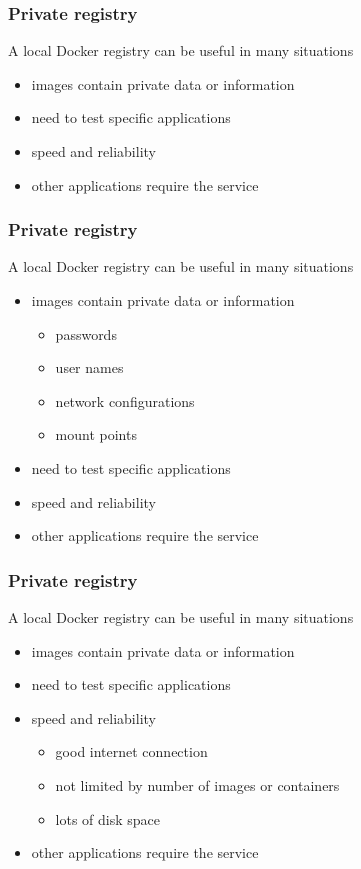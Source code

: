 

\begin{frame}
\frametitle{Private registry}
A local Docker registry can be useful in many situations
\begin{itemize}
\item images contain private data or information
\item need to test specific applications
\item speed and reliability
\item other applications require the service
\end{itemize}
\end{frame}


\begin{frame}
\frametitle{Private registry}
A local Docker registry can be useful in many situations
\begin{itemize}
\item images contain private data or information
  \begin{itemize}
  \item passwords
  \item user names
  \item network configurations
  \item mount points
  \end{itemize}
\item need to test specific applications
\item speed and reliability
\item other applications require the service
\end{itemize}
\end{frame}


\begin{frame}
\frametitle{Private registry}

A local Docker registry can be useful in many situations

\begin{itemize}
\item images contain private data or information
\item need to test specific applications
\item speed and reliability
  \begin{itemize}
  \item good internet connection
  \item not limited by number of images or containers
  \item lots of disk space
  \end{itemize}
\item other applications require the service
\end{itemize}
\end{frame}


